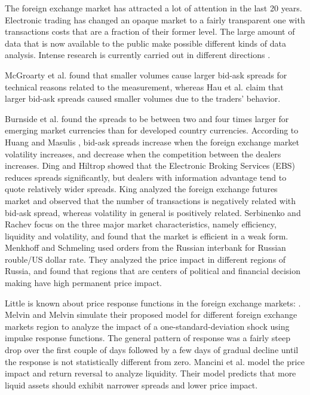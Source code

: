 The foreign exchange market has attracted a lot of attention in the last 20
years. Electronic trading has changed an opaque market to a fairly transparent
one with transactions costs that are a fraction of their former level. The
large amount of data that is now available to the public make possible
different kinds of data analysis. Intense research is currently carried out in
different directions
\cite{curr_speculation,forex_algorithmic,teach_spread,electronic_forex,forex_microstructure,patterns_forex,eur_change_forex,spread_competition,forex_structure,political_forex,forex_liquidity,forex_volatility,info_forex,local_forex,intraday_forex,forex_inefficiency}.

McGroarty et al. \cite{micro_eff} found that smaller volumes cause larger
bid-ask spreads for technical reasons related to the measurement, whereas Hau
et al. \cite{eur_int_curr,eur_change_forex} claim that larger bid-ask spreads
caused smaller volumes due to the traders' behavior.

Burnside et al. \cite{curr_speculation} found the spreads to be between two and
four times larger for emerging market currencies than for developed country
currencies. According to Huang and Masulis \cite{spread_competition}, bid-ask
spreads increase when the foreign exchange market volatility increases, and
decrease when the competition between the dealers increases. Ding and Hiltrop
\cite{electronic_forex} showed that the Electronic Broking Services (EBS)
reduces spreads significantly, but dealers with information advantage tend to
quote relatively wider spreads. King \cite{spread_futures} analyzed the foreign
exchange futures market and observed that the number of transactions is
negatively related with bid-ask spread, whereas volatility in general is
positively related. Serbinenko and Rachev \cite{intraday_forex} focus on the
three major market characteristics, namely efficiency, liquidity and
volatility, and found that the market is efficient in a weak form. Menkhoff and
Schmeling \cite{local_forex} used orders from the Russian interbank for Russian
rouble/US dollar rate. They analyzed the price impact in different regions of
Russia, and found that regions that are centers of political and financial
decision making have high permanent price impact.

Little is known about price response functions in the foreign exchange markets:
\cite{forex_liquidity,forex_volatility,response_funct_fx}. Melvin and Melvin
\cite{forex_volatility} simulate their proposed model for different foreign
exchange markets region to analyze the impact of a one-standard-deviation shock
using impulse response functions. The general pattern of response was a fairly
steep drop over the first couple of days followed by a few days of gradual
decline until the response is not statistically different from zero. Mancini et
al. \cite{forex_liquidity} model the price impact and return reversal to
analyze liquidity. Their model predicts that more liquid assets should exhibit
narrower spreads and lower price impact.

